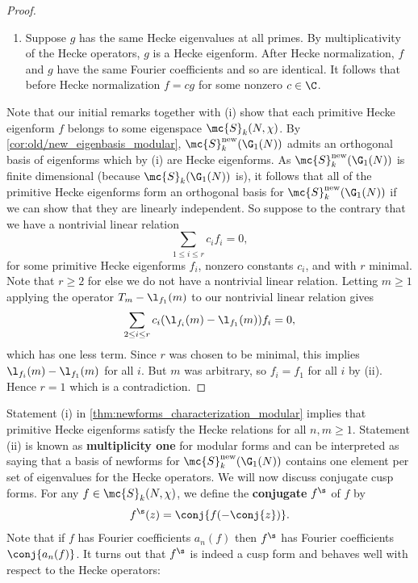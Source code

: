 \documentclass[12pt]{article}
\begin{document}
\begin{proof}
\begin{enumerate}[label*=(\roman*)]
          \item Suppose \(g\) has the same Hecke eigenvalues at all primes. By multiplicativity of the Hecke operators, \(g\) is a Hecke eigenform. After Hecke normalization, \(f\) and \(g\) have the same Fourier coefficients and so are identical. It follows that before Hecke normalization \(f = cg\) for some nonzero \(c \in \C\).
        \end{enumerate}
        Note that our initial remarks together with (i) show that each primitive Hecke eigenform \(f\) belongs to some eigenspace \(\mc{S}_{k}(N,\chi)\). By \cref{cor:old/new_eigenbasis_modular}, \(\mc{S}_{k}^{\mathrm{new}}(\G_{1}(N))\) admits an orthogonal basis of eigenforms which by (i) are Hecke eigenforms. As \(\mc{S}_{k}^{\mathrm{new}}(\G_{1}(N))\) is finite dimensional (because \(\mc{S}_{k}(\G_{1}(N))\) is), it follows that all of the primitive Hecke eigenforms form an orthogonal basis for \(\mc{S}_{k}^{\mathrm{new}}(\G_{1}(N))\) if we can show that they are linearly independent. So suppose to the contrary that we have a nontrivial linear relation
        \[
          \sum_{1 \le i \le r}c_{i}f_{i} = 0,
        \]
        for some primitive Hecke eigenforms \(f_{i}\), nonzero constants \(c_{i}\), and with \(r\) minimal. Note that \(r \ge 2\) for else we do not have a nontrivial linear relation. Letting \(m \ge 1\) applying the operator \(T_{m}-\l_{f_{1}}(m)\) to our nontrivial linear relation gives
        \[
          \sum_{2 \le i \le r}c_{i}(\l_{f_{i}}(m)-\l_{f_{1}}(m))f_{i} = 0,
        \]
        which has one less term. Since \(r\) was chosen to be minimal, this implies \(\l_{f_{i}}(m)-\l_{f_{1}}(m)\) for all \(i\). But \(m\) was arbitrary, so \(f_{i} = f_{1}\) for all \(i\) by (ii). Hence \(r = 1\) which is a contradiction.
      \end{proof}

      Statement (i) in \cref{thm:newforms_characterization_modular} implies that primitive Hecke eigenforms satisfy the Hecke relations for all \(n,m \ge 1\). Statement (ii) is known as \textbf{multiplicity one} for modular forms and can be interpreted as saying that a basis of newforms for \(\mc{S}_{k}^{\mathrm{new}}(\G_{1}(N))\) contains one element per set of eigenvalues for the Hecke operators. We will now discuss conjugate cusp forms. For any \(f \in \mc{S}_{k}(N,\chi)\), we define the \textbf{conjugate} \(f^{\s}\) of \(f\) by
      \[
        f^{\s}(z) = \conj{f(-\conj{z})}.
      \]
      Note that if \(f\) has Fourier coefficients \(a_{n}(f)\) then \(f^{\s}\) has Fourier coefficients \(\conj{a_{n}(f)}\). It turns out that \(f^{\s}\) is indeed a cusp form and behaves well with respect to the Hecke operators:
\end{document}
